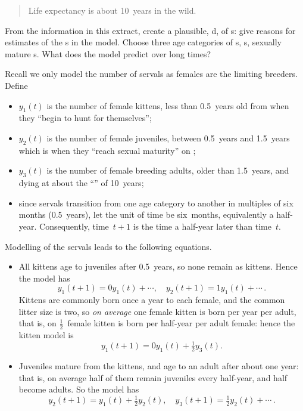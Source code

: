 \begin{example}
\begin{quote}
Life expectancy is about 10~years in the wild.
\end{quote}
From the information in this extract, create a plausible, d,   of s: give reasons for estimates of the s in the model.
Choose three age categories of s, s, sexually mature s.
What does the model predict over long times?
\begin{solution} 
Recall we only model the number of \emph{} servals as females are the limiting breeders.
Define 
\begin{itemize}
\item \(y_1(t)\) is the number of female kittens, less than 0.5~years old from when they ``begin to hunt for themselves'';
\item \(y_2(t)\) is the number of female juveniles, between 0.5~years and 1.5~years which is when they ``reach sexual maturity'' on ;
\item \(y_3(t)\) is the number of female breeding adults, older than 1.5~years, and dying at about the ``'' of 10~years;
\item since servals transition from one age category to another in multiples of six months (0.5~years), let the unit of time be six~months, equivalently a half-year.  
Consequently, time~\(t+1\) is the time a half-year later than time~\(t\).
\end{itemize}
Modelling of the servals leads to the following equations.
\begin{itemize}
\item All kittens age to juveniles after 0.5~years, so none remain as kittens.  
Hence the model has 
\begin{equation*}
y_1(t+1)=0y_1(t)+\cdots,\quad
y_2(t+1)=1y_1(t)+\cdots\,.
\end{equation*}
Kittens are commonly born once a year to each female, and the common litter size is two, so \emph{on average} one female kitten is born per year per adult, that is, on  \(\frac12\)~female kitten is born per half-year per adult female: hence the kitten model is
\begin{equation*}
y_1(t+1)=0y_1(t)+\tfrac12y_3(t).
\end{equation*}

\item Juveniles mature from the kittens, and age to an adult after about one year: that is, on average half of them remain juveniles every half-year, and half become adults.
So the model has 
\begin{equation*}
y_2(t+1)=y_1(t)+\tfrac12y_2(t),\quad
y_3(t+1)=\tfrac12y_2(t)+\cdots\,.
\end{equation*}


\end{itemize}
\end{solution}
\end{example}
